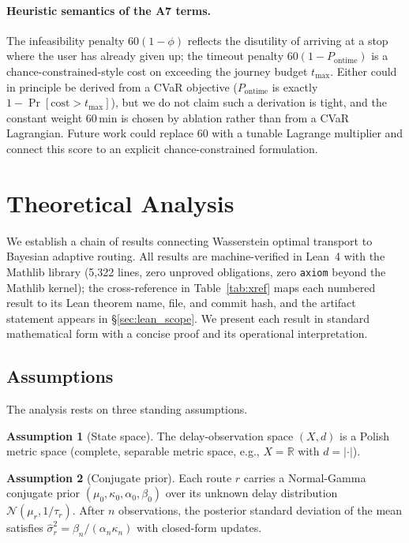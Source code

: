 \documentclass[11pt]{article}
\theoremstyle{definition}
\newtheorem{assumption}{Assumption}
\theoremstyle{remark}
\begin{document}
\paragraph{Heuristic semantics of the A7 terms.} The infeasibility
penalty $60(1-\phi)$ reflects the disutility of arriving at a stop
where the user has already given up; the timeout penalty
$60(1-P_{\mathrm{ontime}})$ is a chance-constrained-style cost on
exceeding the journey budget $t_{\max}$. Either could in principle
be derived from a CVaR objective ($P_{\mathrm{ontime}}$ is exactly
$1 - \Pr[\mathrm{cost} > t_{\max}]$), but we do not claim such a
derivation is tight, and the constant weight $60$\,min is chosen by
ablation rather than from a CVaR Lagrangian. Future work could
replace $60$ with a tunable Lagrange multiplier and connect this
score to an explicit chance-constrained formulation.

\section{Theoretical Analysis}
\label{sec:lean}

We establish a chain of results connecting Wasserstein optimal transport
to Bayesian adaptive routing.
All results are machine-verified in Lean~4 with the Mathlib library
(5{,}322 lines, zero unproved obligations, zero \texttt{axiom}
beyond the Mathlib kernel); the cross-reference in
Table~\ref{tab:xref} maps each numbered result to its Lean theorem
name, file, and commit hash, and the artifact statement appears in
\S\ref{sec:lean_scope}.
We present each result in standard mathematical form with a concise
proof and its operational interpretation.

\subsection{Assumptions}

The analysis rests on three standing assumptions.

\begin{assumption}[State space]\label{asm:polish}
The delay-observation space $(X, d)$ is a Polish metric space
(complete, separable metric space, e.g., $X = \mathbb{R}$ with $d = |\cdot|$).
\end{assumption}

\begin{assumption}[Conjugate prior]\label{asm:prior}
Each route $r$ carries a Normal-Gamma conjugate prior
$(\mu_0, \kappa_0, \alpha_0, \beta_0)$ over its unknown delay distribution
$\mathcal{N}(\mu_r, 1/\tau_r)$.
After $n$ observations, the posterior standard deviation of the mean satisfies
$\hat\sigma_r^2 = \beta_n / (\alpha_n \kappa_n)$ with closed-form updates.
\end{assumption}
\end{document}

